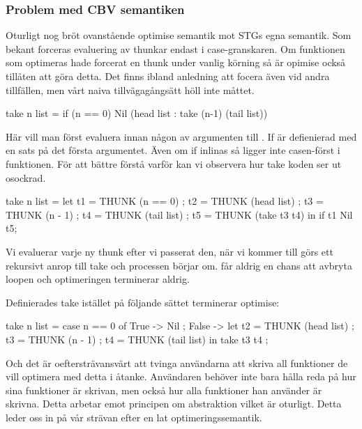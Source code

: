 \documentclass[../Optimise]{subfiles}
\begin{document}

\subsubsection{Problem med CBV semantiken}

Oturligt nog bröt ovanstående optimise semantik mot STGs egna semantik. 
Som bekant forceras evaluering av thunkar endast i case-granskaren. 
Om funktionen som optimeras hade forcerat en thunk under vanlig körning så är
 opimise också tillåten att göra detta. Det finns ibland anledning att focera
 även vid andra tillfällen, men vårt naiva tillvägagångsätt höll inte måttet.

\begin{codeEx}
take n list = if (n == 0) Nil (head list : take (n-1) (tail list))
\end{codeEx}
Här vill man först evaluera  innan någon av argumenten till .
If är defienierad med en  sats på det första argumentet. Även om
if inlinas så ligger inte casen-först i funktionen. För att bättre förstå varför kan vi observera hur take koden ser ut osockrad. 

\begin{codeEx}
take n list = let 
    { t1 = THUNK (n == 0)
    ; t2 = THUNK (head list)
    ; t3 = THUNK (n - 1)
    ; t4 = THUNK (tail list)
    ; t5 = THUNK (take t3 t4)
    } in  if t1 Nil t5;
\end{codeEx}

Vi evaluerar varje ny thunk efter vi passerat den, när vi kommer till 
 görs ett rekursivt anrop till take och processen börjar om.
 får aldrig en chans att avbryta loopen och optimeringen terminerar aldrig.

Definierades take istället på följande sättet terminerar optimise:

\begin{codeEx}
take n list = case n == 0 of
    { True -> Nil
    ; False -> let 
        { t2 = THUNK (head list)
        ; t3 = THUNK (n - 1)
        ; t4 = THUNK (tail list)
        } in  take t3 t4
    };
\end{codeEx}


Och det är oeftersträvansvärt att tvinga användarna att skriva all funktioner
de vill optimera med detta i åtanke. Användaren behöver inte bara hålla reda på 
hur sina funktioner är skrivan, men också hur alla funktioner han använder är skrivna. 
Detta arbetar emot principen om abstraktion vilket är oturligt. Detta leder oss in på vår strävan
efter en lat optimeringssemantik.
\end{document}
